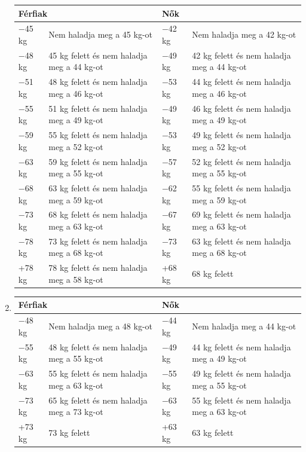 \documentclass[]{report}
\begin{document}
\begin{enumerate}
\begin{samepage}
\begin{center}
\begin{tabular}{ |l|l|l|l| }
 \hline
 \multicolumn{2}{|l|}{Férfiak} & \multicolumn{2}{l|}{Nők} \\
 \hline
 $-$45 kg & Nem haladja meg a 45 kg-ot & $-$42 kg & Nem haladja meg a 42 kg-ot \\
 \hline
 $-$48 kg & 45 kg felett és nem haladja meg a 44 kg-ot & $-$49 kg & 42 kg felett és nem haladja meg a 44 kg-ot \\
 \hline
 $-$51 kg & 48 kg felett és nem haladja meg a 46 kg-ot & $-$53 kg & 44 kg felett és nem haladja meg a 46 kg-ot \\
 \hline
 $-$55 kg & 51 kg felett és nem haladja meg a 49 kg-ot & $-$49 kg & 46 kg felett és nem haladja meg a 49 kg-ot \\
 \hline
 $-$59 kg & 55 kg felett és nem haladja meg a 52 kg-ot & $-$53 kg & 49 kg felett és nem haladja meg a 52 kg-ot \\
 \hline
 $-$63 kg & 59 kg felett és nem haladja meg a 55 kg-ot & $-$57 kg & 52 kg felett és nem haladja meg a 55 kg-ot \\
 \hline
 $-$68 kg & 63 kg felett és nem haladja meg a 59 kg-ot & $-$62 kg & 55 kg felett és nem haladja meg a 59 kg-ot \\
 \hline
 $-$73 kg & 68 kg felett és nem haladja meg a 63 kg-ot & $-$67 kg & 69 kg felett és nem haladja meg a 63 kg-ot \\
 \hline
 $-$78 kg & 73 kg felett és nem haladja meg a 68 kg-ot & $-$73 kg & 63 kg felett és nem haladja meg a 68 kg-ot \\
 \hline
 +78 kg & 78 kg felett és nem haladja meg a 58 kg-ot & +68 kg & 68 kg felett \\
 \hline
\end{tabular}
\end{center}
\end{samepage}

\item


\begin{center}
\begin{tabular}{ |l|l|l|l| }
 \hline
 \multicolumn{2}{|l|}{Férfiak} & \multicolumn{2}{l|}{Nők} \\
 \hline
 $-$48 kg & Nem haladja meg a 48 kg-ot & $-$44 kg & Nem haladja meg a 44 kg-ot \\
 \hline
 $-$55 kg & 48 kg felett és nem haladja meg a 55 kg-ot & $-$49 kg & 44 kg felett és nem haladja meg a 49 kg-ot \\
 \hline
 $-$63 kg & 55 kg felett és nem haladja meg a 63 kg-ot & $-$55 kg & 49 kg felett és nem haladja meg a 55 kg-ot \\
 \hline
 $-$73 kg & 65 kg felett és nem haladja meg a 73 kg-ot & $-$63 kg & 55 kg felett és nem haladja meg a 63 kg-ot \\
 \hline
 +73 kg & 73 kg felett & +63 kg & 63 kg felett \\
 \hline
\end{tabular}
\end{center}


\end{enumerate}
\end{document}
